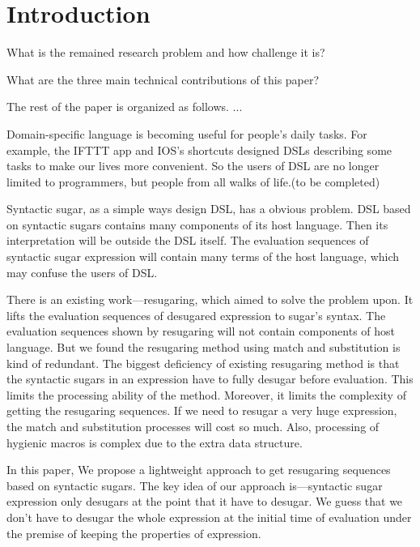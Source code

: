 \section{Introduction}



What is the remained research problem and how challenge it is?


What are the three main technical contributions of this paper?

The rest of the paper is organized as follows. ...

Domain-specific language\cite{dsl} is becoming useful for people's daily tasks. For example, the IFTTT app and IOS's shortcuts designed DSLs describing some tasks to make our lives more convenient. So the users of DSL are no longer limited to programmers, but people from all walks of life.(to be completed)

Syntactic sugar\cite{syntacticsugar}, as a simple ways design DSL, has a obvious problem. DSL based on syntactic sugars contains many components of its host language. Then its interpretation will be outside the DSL itself. The evaluation sequences of syntactic sugar expression will contain many terms of the host language, which may confuse the users of DSL.

There is an existing work---resugaring\cite{resugaring}\cite{hygienic}, which aimed to solve the problem upon. It lifts the evaluation sequences of desugared expression to sugar's syntax. The evaluation sequences shown by resugaring will not contain components of host language. But we found the resugaring method using match and substitution is kind of redundant. The biggest deficiency of existing resugaring method is that the syntactic sugars in an expression have to fully desugar before evaluation. This limits the processing ability of the method. Moreover, it limits the complexity of getting the resugaring sequences. If we need to resugar a very huge expression, the match and substitution processes will cost so much. Also, processing of hygienic macros is complex due to the extra data structure.

In this paper, We propose a lightweight approach to get resugaring sequences based on syntactic sugars. The key idea of our approach is---syntactic sugar expression only desugars at the point that it have to desugar. We guess that we don't have to desugar the whole expression at the initial time of evaluation under the premise of keeping the properties of expression. 

